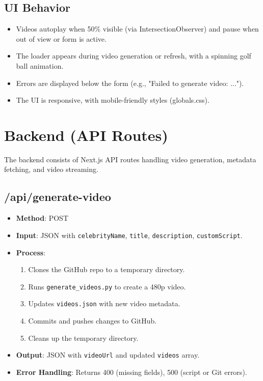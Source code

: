 \documentclass[a4paper,12pt]{article}
\begin{document}
\subsection{UI Behavior}
\begin{itemize}
    \item Videos autoplay when 50\% visible (via IntersectionObserver) and pause when out of view or form is active.
    \item The loader appears during video generation or refresh, with a spinning golf ball animation.
    \item Errors are displayed below the form (e.g., "Failed to generate video: ...").
    \item The UI is responsive, with mobile-friendly styles (globals.css).
\end{itemize}

\section{Backend (API Routes)}
The backend consists of Next.js API routes handling video generation, metadata fetching, and video streaming.

\subsection{/api/generate-video}
\begin{itemize}
    \item \textbf{Method}: POST
    \item \textbf{Input}: JSON with \texttt{celebrityName}, \texttt{title}, \texttt{description}, \texttt{customScript}.
    \item \textbf{Process}:
        \begin{enumerate}
            \item Clones the GitHub repo to a temporary directory.
            \item Runs \texttt{generate\_videos.py} to create a 480p video.
            \item Updates \texttt{videos.json} with new video metadata.
            \item Commits and pushes changes to GitHub.
            \item Cleans up the temporary directory.
        \end{enumerate}
    \item \textbf{Output}: JSON with \texttt{videoUrl} and updated \texttt{videos} array.
    \item \textbf{Error Handling}: Returns 400 (missing fields), 500 (script or Git errors).
\end{itemize}
\end{document}

